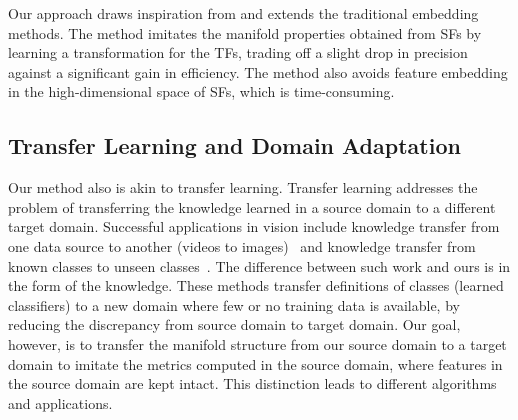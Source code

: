 \documentclass[10pt,twocolumn,letterpaper]{article}
\begin{document}
Our approach draws inspiration from and extends the traditional
embedding methods. %
The method 
imitates the manifold properties obtained from SFs by learning a 
transformation for the TFs, trading off a slight drop in precision 
against a significant gain in efficiency. The method also avoids 
feature embedding in the high-dimensional space of SFs, which is 
time-consuming.





\subsection{Transfer Learning and Domain Adaptation}
Our method also is akin to transfer learning.  Transfer
learning addresses the problem of transferring the knowledge learned
in a source domain to a different target domain. Successful
applications in vision include knowledge transfer from one data source
to another (\eg videos to images)~\cite{tl:kernel:11, DA:iccv11,
  DASA:iccv13} and knowledge transfer from known classes to unseen
classes~\cite{tl:attribute:09}. The difference between such work and
ours is in the form of the knowledge. These methods transfer
definitions of classes (learned classifiers) to a new domain where few
or no training data is available, by reducing the discrepancy from
source domain to target domain. Our goal, however, is to transfer the
manifold structure from our source domain to a target domain to
imitate the metrics computed in the source domain, where features in
the source domain are kept intact. This distinction leads to 
different algorithms and applications.
\end{document}
